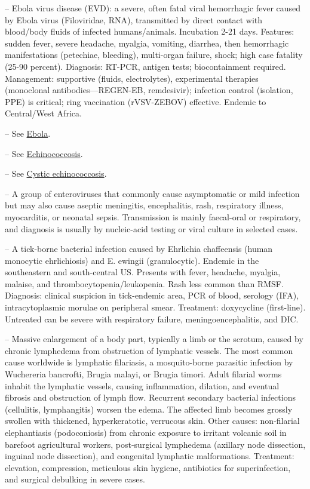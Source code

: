 -- Ebola virus disease (EVD): a severe, often fatal viral hemorrhagic fever caused by Ebola virus (Filoviridae, RNA), transmitted by direct contact with blood/body fluids of infected humans/animals. Incubation 2-21 days. Features: sudden fever, severe headache, myalgia, vomiting, diarrhea, then hemorrhagic manifestations (petechiae, bleeding), multi-organ failure, shock; high case fatality (25-90 percent). Diagnosis: RT-PCR, antigen tests; biocontainment required. Management: supportive (fluids, electrolytes), experimental therapies (monoclonal antibodies—REGEN-EB, remdesivir); infection control (isolation, PPE) is critical; ring vaccination (rVSV-ZEBOV) effective. Endemic to Central/West Africa.

-- See \hyperlink{Ebola}{Ebola}.

-- See \hyperlink{Echinococcosis}{Echinococcosis}.

-- See \hyperlink{Cystic echinococcosis}{Cystic echinococcosis}.

-- A group of enteroviruses that commonly cause asymptomatic or mild infection but may also cause aseptic meningitis, encephalitis, rash, respiratory illness, myocarditis, or neonatal sepsis. Transmission is mainly faecal-oral or respiratory, and diagnosis is usually by nucleic-acid testing or viral culture in selected cases.

-- A tick-borne bacterial infection caused by Ehrlichia chaffeensis (human monocytic ehrlichiosis) and E. ewingii (granulocytic). Endemic in the southeastern and south-central US. Presents with fever, headache, myalgia, malaise, and thrombocytopenia/leukopenia. Rash less common than RMSF. Diagnosis: clinical suspicion in tick-endemic area, PCR of blood, serology (IFA), intracytoplasmic morulae on peripheral smear. Treatment: doxycycline (first-line). Untreated can be severe with respiratory failure, meningoencephalitis, and DIC.

-- Massive enlargement of a body part, typically a limb or the scrotum, caused by chronic lymphedema from obstruction of lymphatic vessels. The most common cause worldwide is lymphatic filariasis, a mosquito-borne parasitic infection by Wuchereria bancrofti, Brugia malayi, or Brugia timori. Adult filarial worms inhabit the lymphatic vessels, causing inflammation, dilation, and eventual fibrosis and obstruction of lymph flow. Recurrent secondary bacterial infections (cellulitis, lymphangitis) worsen the edema. The affected limb becomes grossly swollen with thickened, hyperkeratotic, verrucous skin. Other causes: non-filarial elephantiasis (podoconiosis) from chronic exposure to irritant volcanic soil in barefoot agricultural workers, post-surgical lymphedema (axillary node dissection, inguinal node dissection), and congenital lymphatic malformations. Treatment: elevation, compression, meticulous skin hygiene, antibiotics for superinfection, and surgical debulking in severe cases.

